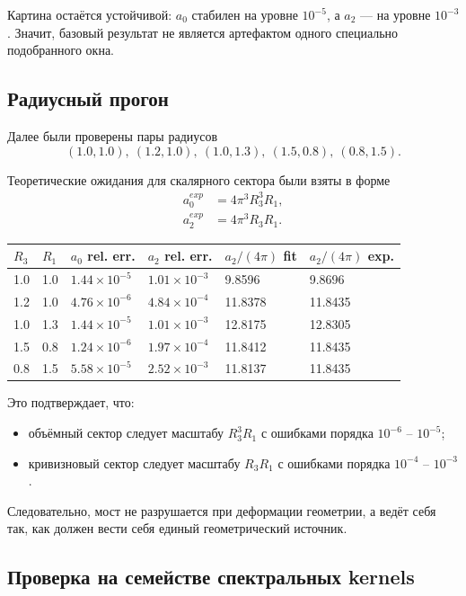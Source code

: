 \documentclass[12pt,a4paper]{article}
\begin{document}
Картина остаётся устойчивой: \(a_0\) стабилен на уровне \(10^{-5}\), а \(a_2\) --- на уровне \(10^{-3}\). Значит, базовый результат не является артефактом одного специально подобранного окна.

\subsection{Радиусный прогон}

Далее были проверены пары радиусов
\[
(1.0,1.0),\ (1.2,1.0),\ (1.0,1.3),\ (1.5,0.8),\ (0.8,1.5).
\]

Теоретические ожидания для скалярного сектора были взяты в форме
\begin{align}
 a_0^{exp} &= 4\pi^3 R_3^3R_1,\\
 a_2^{exp} &= 4\pi^3 R_3R_1.
\end{align}

\begin{longtable}{p{2.0cm}p{2.0cm}p{2.5cm}p{2.5cm}p{2.4cm}p{2.4cm}}
\toprule
$R_3$ & $R_1$ & $a_0$ rel. err. & $a_2$ rel. err. & $a_2/(4\pi)$ fit & $a_2/(4\pi)$ exp. \\
\midrule
\endhead
1.0 & 1.0 & $1.44\times 10^{-5}$ & $1.01\times 10^{-3}$ & 9.8596 & 9.8696 \\
1.2 & 1.0 & $4.76\times 10^{-6}$ & $4.84\times 10^{-4}$ & 11.8378 & 11.8435 \\
1.0 & 1.3 & $1.44\times 10^{-5}$ & $1.01\times 10^{-3}$ & 12.8175 & 12.8305 \\
1.5 & 0.8 & $1.24\times 10^{-6}$ & $1.97\times 10^{-4}$ & 11.8412 & 11.8435 \\
0.8 & 1.5 & $5.58\times 10^{-5}$ & $2.52\times 10^{-3}$ & 11.8137 & 11.8435 \\
\bottomrule
\end{longtable}

Это подтверждает, что:
\begin{itemize}
    \item объёмный сектор следует масштабу \(R_3^3R_1\) с ошибками порядка \(10^{-6}\) -- \(10^{-5}\);
    \item кривизновый сектор следует масштабу \(R_3R_1\) с ошибками порядка \(10^{-4}\) -- \(10^{-3}\).
\end{itemize}

Следовательно, мост не разрушается при деформации геометрии, а ведёт себя так, как должен вести себя единый геометрический источник.

\subsection{Проверка на семействе спектральных kernels}
\end{document}

